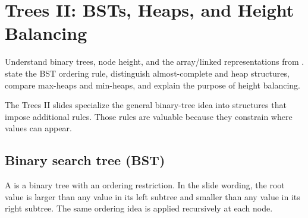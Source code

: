 \chapter{Trees II: BSTs, Heaps, and Height Balancing}\label{ch:trees-ii}

\chapterguide%
  {Understand binary trees, node height, and the array/linked representations from .}
  {state the BST ordering rule, distinguish almost-complete and heap structures, compare max-heaps and min-heaps, and explain the purpose of height balancing.}

The Trees II slides specialize the general binary-tree idea into structures that impose additional rules. Those rules are valuable because they constrain where values can appear.

\section{Binary search tree (BST)}

A  is a binary tree with an ordering restriction. In the slide wording, the root value is larger than any value in its left subtree and smaller than any value in its right subtree. The same ordering idea is applied recursively at each node.


